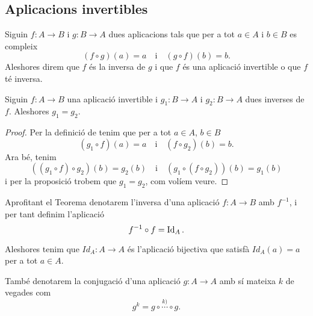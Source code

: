 \documentclass[../Apunts.tex]{subfiles}
\begin{document}
	\subsection{Aplicacions invertibles}
	\begin{definition}
		\label{def:aplicació invertible}
		\label{def:inversa d'una aplicació}
		Siguin \(f\colon A\rightarrow B\) i \(g\colon B\rightarrow A\) dues aplicacions tals que per a tot \(a\in A\) i \(b\in B\) es compleix
		\[(f\circ g)(a)=a\quad\text{i}\quad(g\circ f)(b)=b.\]
		Aleshores direm que \(f\) és la inversa de \(g\) i que \(f\) és una aplicació invertible o que \(f\) té inversa.
	\end{definition}
	\begin{theorem}
		\label{thm:unicitat de les inverses de les aplicacions bijectives}
		Siguin \(f\colon A\rightarrow B\) una aplicació invertible i \(g_{1}\colon B\rightarrow A\) i \(g_{2}\colon B\rightarrow A\) dues inverses de \(f\). Aleshores \(g_{1}=g_{2}\).
		\begin{proof}
			Per la definició de  tenim que per a tot \(a\in A\), \(b\in B\)
			\[(g_{1}\circ f)(a)=a\quad\text{i}\quad(f\circ g_{2})(b)=b.\]
			Ara bé, tenim
			\[((g_{1}\circ f)\circ g_{2})(b)=g_{2}(b)\quad\text{i}\quad(g_{1}\circ(f\circ g_{2}))(b)=g_{1}(b)\]
			i per la proposició  trobem que \(g_{1}=g_{2}\), com volíem veure.
		\end{proof}
	\end{theorem}
	\begin{notation}
		Aprofitant el Teorema  denotarem l'inversa d'una aplicació \(f:A\rightarrow B\) amb \(f^{-1}\), i per tant definim l'aplicació
		\[f^{-1}\circ f=\operatorname{Id}_{A}.\]
		
		Aleshores tenim que \(Id_{A}\colon A\rightarrow A\) és l'aplicació bijectiva que satisfà \(Id_{A}(a)=a\) per a tot \(a\in A\).
		
		També denotarem la conjugació d'una aplicació \(g\colon A\rightarrow A\) amb sí mateixa \(k\) de vegades com \[g^{k}=g\circ\overset{k)}{\cdots}\circ g.\]
	\end{notation}
\end{document}
